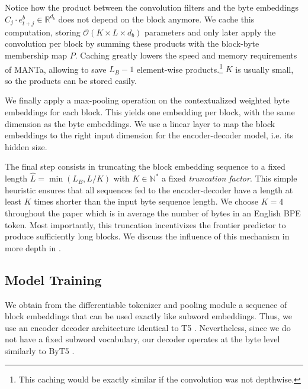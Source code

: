 Notice how the product between the convolution filters and the byte embeddings $C_j \cdot e^b_{t+j}\in\mathbb{R}^{d_b}$ does not depend on the block anymore. We cache this computation, storing $\mathcal{O}(K\times L\times d_b)$ parameters and only later apply the convolution per block by summing these products with the block-byte membership map $P$. Caching greatly lowers the speed and memory requirements of MANTa, allowing to save $L_B-1$ element-wise products.\footnote{This caching would be exactly similar if the convolution was not depthwise.} $K$ is usually small, so the products can be stored easily.

We finally apply a max-pooling operation on the contextualized weighted byte embeddings for each block. This yields one embedding per block, with the same dimension as the byte embeddings. We use a linear layer to map the block embeddings to the right input dimension for the encoder-decoder model, i.e. its hidden size.


The final step consists in truncating the block embedding sequence to a fixed length $\hat{L} = \min(L_B, L / K)$ with $K\in \mathbb{N^*}$ a fixed \textit{truncation factor}. This simple heuristic ensures that all sequences fed to the encoder-decoder have a length at least $K$ times shorter than the input byte sequence length. We choose $K=4$ throughout the paper which is in average the number of bytes in an English BPE token. Most importantly, this truncation incentivizes the frontier predictor to produce sufficiently long blocks. We discuss the influence of this mechanism in more depth in .


\subsection{Model Training}

We obtain from the differentiable tokenizer and pooling module a sequence of block embeddings that can be used exactly like subword embeddings. Thus, we use an encoder decoder architecture identical to T5 \citep{raffel2020t5}. Nevertheless, since we do not have a fixed subword vocabulary, our decoder operates at the byte level similarly to ByT5 \citep{xue2022byt5}.

